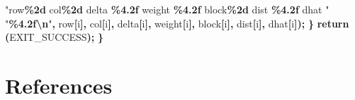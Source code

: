 \documentclass[
  12pt,
]{article}
\newenvironment{Shaded}{\begin{snugshade}}{\end{snugshade}}
\newcommand{\ControlFlowTok}[1]{\textcolor[rgb]{0.13,0.29,0.53}{\textbf{#1}}}
\newcommand{\NormalTok}[1]{#1}
\newcommand{\OperatorTok}[1]{\textcolor[rgb]{0.81,0.36,0.00}{\textbf{#1}}}
\newcommand{\SpecialCharTok}[1]{\textcolor[rgb]{0.81,0.36,0.00}{\textbf{#1}}}
\newcommand{\StringTok}[1]{\textcolor[rgb]{0.31,0.60,0.02}{#1}}
\begin{document}
\begin{Shaded}
\begin{Highlighting}[]
            \StringTok{"row}\SpecialCharTok{\%2d}\StringTok{ col}\SpecialCharTok{\%2d}\StringTok{ delta }\SpecialCharTok{\%4.2f}\StringTok{ weight }\SpecialCharTok{\%4.2f}\StringTok{ block}\SpecialCharTok{\%2d}\StringTok{ dist }\SpecialCharTok{\%4.2f}\StringTok{ dhat "}
            \StringTok{"}\SpecialCharTok{\%4.2f\textbackslash{}n}\StringTok{"}\OperatorTok{,}
\NormalTok{            row}\OperatorTok{[}\NormalTok{i}\OperatorTok{],}\NormalTok{ col}\OperatorTok{[}\NormalTok{i}\OperatorTok{],}\NormalTok{ delta}\OperatorTok{[}\NormalTok{i}\OperatorTok{],}\NormalTok{ weight}\OperatorTok{[}\NormalTok{i}\OperatorTok{],}\NormalTok{ block}\OperatorTok{[}\NormalTok{i}\OperatorTok{],}\NormalTok{ dist}\OperatorTok{[}\NormalTok{i}\OperatorTok{],}\NormalTok{ dhat}\OperatorTok{[}\NormalTok{i}\OperatorTok{]);}
    \OperatorTok{\}}
    \ControlFlowTok{return} \OperatorTok{(}\NormalTok{EXIT\_SUCCESS}\OperatorTok{);}
\OperatorTok{\}}
\end{Highlighting}
\end{Shaded}

\section{References}\label{references}
\end{document}
